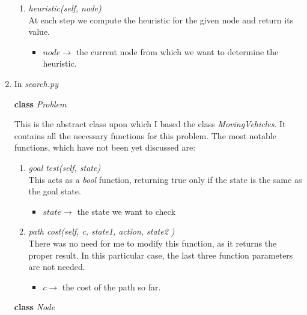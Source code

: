 \documentclass{article}
\begin{document}
\begin{enumerate}[label=\Roman*]
\begin{enumerate}
    \item \emph{heuristic(\emph{self}, node)} \\
    At each step we compute the heuristic for the given node and return its value.
    \begin{itemize}
        \item $node \rightarrow$ the current node from which we want to determine the heuristic.
    \end{itemize}
     
    \end{enumerate}

\item In \emph{search.py}

\begin{center}
    \textbf{class} \emph{Problem}
\end{center}
      
      This is the abstract class upon which I based the class \emph{MovingVehicles}. It contains all the necessary functions for this problem. The most notable functions, which have not been yet discussed are:
      
      \begin{enumerate}
          \item \emph{goal \textunderscore test(\emph{self}, state)} \\
          This acts as a \emph{bool} function, returning true only if the state is the same as the goal state.
          \begin{itemize}
              \item $state \rightarrow$ the state we want to check
          \end{itemize}
          
         \item \emph{path \textunderscore cost(\emph{self}, c, state1, action, state2 )} \\
          There was no need for me to modify this function, as it returns the proper result. In this particular case, the last three function parameters are not needed.
          \begin{itemize}
              \item $c \rightarrow$ the cost of the path so far.
          \end{itemize}
          
      \end{enumerate}
      
      \begin{center}
          \textbf{class} \emph{Node}
      \end{center}
      

\end{enumerate}
\end{document}
